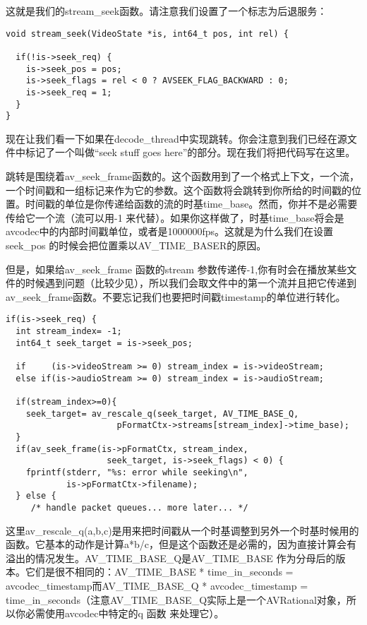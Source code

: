 这就是我们的stream_seek函数。请注意我们设置了一个标志为后退服务：

\begin{lstlisting}
void stream_seek(VideoState *is, int64_t pos, int rel) {

  if(!is->seek_req) {
    is->seek_pos = pos;
    is->seek_flags = rel < 0 ? AVSEEK_FLAG_BACKWARD : 0;
    is->seek_req = 1;
  }
}
\end{lstlisting}

现在让我们看一下如果在decode_thread中实现跳转。你会注意到我们已经在源文件中标记了一个叫做“seek stuff goes here”的部分。现在我们将把代码写在这里。

跳转是围绕着av_seek_frame函数的。这个函数用到了一个格式上下文，一个流，一个时间戳和一组标记来作为它的参数。这个函数将会跳转到你所给的时间戳的位置。时间戳的单位是你传递给函数的流的时基time_base。然而，你并不是必需要传给它一个流（流可以用-1 来代替）。如果你这样做了，时基time_base将会是avcodec中的内部时间戳单位，或者是1000000fps。这就是为什么我们在设置seek_pos 的时候会把位置乘以AV_TIME_BASER的原因。

但是，如果给av_seek_frame 函数的stream 参数传递传-1,你有时会在播放某些文件的时候遇到问题（比较少见），所以我们会取文件中的第一个流并且把它传递到av_seek_frame函数。不要忘记我们也要把时间戳timestamp的单位进行转化。

\begin{lstlisting}
if(is->seek_req) {
  int stream_index= -1;
  int64_t seek_target = is->seek_pos;

  if     (is->videoStream >= 0) stream_index = is->videoStream;
  else if(is->audioStream >= 0) stream_index = is->audioStream;

  if(stream_index>=0){
    seek_target= av_rescale_q(seek_target, AV_TIME_BASE_Q,
                      pFormatCtx->streams[stream_index]->time_base);
  }
  if(av_seek_frame(is->pFormatCtx, stream_index,
                    seek_target, is->seek_flags) < 0) {
    fprintf(stderr, "%s: error while seeking\n",
            is->pFormatCtx->filename);
  } else {
     /* handle packet queues... more later... */
\end{lstlisting}

这里av_rescale_q(a,b,c)是用来把时间戳从一个时基调整到另外一个时基时候用的函数。它基本的动作是计算a*b/c，但是这个函数还是必需的，因为直接计算会有溢出的情况发生。AV_TIME_BASE_Q是AV_TIME_BASE 作为分母后的版本。它们是很不相同的：AV_TIME_BASE * time_in_seconds = avcodec_timestamp而AV_TIME_BASE_Q * avcodec_timestamp = time_in_seconds（注意AV_TIME_BASE_Q实际上是一个AVRational对象，所以你必需使用avcodec中特定的q 函数 来处理它）。

